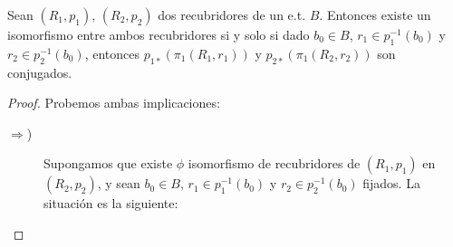 \begin{teo}\label{teo:clasificacion_recubridores}
    Sean $(R_1, p_1)$, $(R_2, p_2)$ dos recubridores de un e.t. $B$. Entonces existe un isomorfismo entre ambos recubridores si y solo si dado $b_0\in B$,  $r_1\in p_1^{-1}(b_0)$ y $r_2\in p_2^{-1}(b_0)$, entonces $p_{1*}(\pi_1(R_1,r_1))$ y $p_{2*}(\pi_1(R_2,r_2))$ son conjugados.

    \begin{proof}
        Probemos ambas implicaciones:
        \begin{description}
            \item[$\Longrightarrow$)] Supongamos que existe $\phi$ isomorfismo de recubridores de $(R_1, p_1)$ en $(R_2, p_2)$, y sean $b_0\in B$, $r_1\in p_1^{-1}(b_0)$ y $r_2\in p_2^{-1}(b_0)$ fijados. La situación es la siguiente:
            \begin{center}
            \end{center}


\end{description}
\end{proof}
\end{teo}
